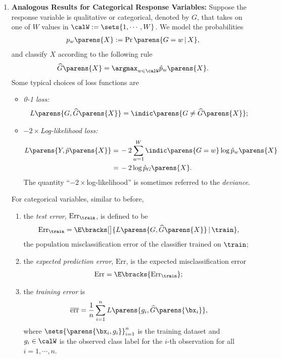 \documentclass[12pt]{article}
\begin{document}
\begin{enumerate}[label=\textbf{\arabic*.}]
	\item \textbf{Analogous Results for Categorical Response Variables:} Suppose the response variable is qualitative or categorical, denoted by $G$, that takes on one of $W$ values in $\calW := \sets{1, \cdots, W}$. We model the probabilities 
	\begin{align*}
		p_w \parens{X} := \Pr \parens{G = w \,\vert\, X}, 
	\end{align*}
	and classify $X$ according to the following rule 
	\begin{align*}
		\widehat{G} \parens{X} = \argmax_{w \in \calW} \hat{p}_w \parens{X}. 
	\end{align*}
	Some typical choices of loss functions are 
	\begin{itemize}
		\item \textit{0-1 loss:} 
		\begin{align*}
			L \parens{G, \widehat{G} \parens{X}} = \indic \parens{ G \ne \widehat{G} \parens{X}}; 
		\end{align*}
		\item \textit{$-2 \times$Log-likelihood loss:} 
		\begin{align*}
			L \parens{Y, \hat{p} \parens{X}} = & \, -2 \sum_{w=1}^W \indic \parens{G = w} \log \hat{p}_w \parens{X} \\ 
			= & \, -2 \log \hat{p}_G \parens{X}. 
		\end{align*}
		The quantity ``$-2\times$log-likelihood'' is sometimes referred to the \textit{deviance}. 
	\end{itemize}
	For categorical variables, similar to before, 
	\begin{enumerate}
		\item the \textit{test error}, $\mathrm{Err}_{\train}$, is defined to be 
		\begin{align*}
			\mathrm{Err}_{\train} = \E \bracks[\big]{L \parens{G, \widehat{G} \parens{X}} \,\vert\, \train}, 
		\end{align*}
		the population misclassification error of the classifier trained on $\train$; 
		\item the \textit{expected prediction error}, $\mathrm{Err}$, is the expected misclassification error 
		\begin{align*}
			\mathrm{Err} = \E \bracks{\mathrm{Err}_{\train}}; 
		\end{align*}
		\item the \textit{training error} is 
		\begin{align*}
			\overline{\mathrm{err}} = \frac{1}{n} \sum_{i=1}^n L \parens{g_i, \widehat{G} \parens{\bx_i}}, 
		\end{align*}
		where $\sets{\parens{\bx_i, g_i}}_{i=1}^n$ is the training dataset and $g_i \in \calW$ is the observed class label for the $i$-th observation for all $i = 1, \cdots, n$. 
	\end{enumerate}
	

\end{enumerate}
\end{document}

